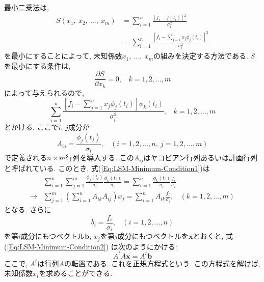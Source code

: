 最小二乗法は, 
\begin{align}
    S(x_{1},~ x_{2},~\ldots,~ x_{m})
    &=
    \sum_{i=1}^{n} \frac{[f_{i} - f(t_{i})]^{2}}{\sigma_{i}^{2}}
    \\ &=
    \sum_{i=1}^{n}
    \frac{[f_{i} - \sum_{j=1}^{n} x_{j} \phi_{j}(t_{i})]^{2}}
    {\sigma_{i}^{2}}
\end{align}
を最小にすることによって, 未知係数$x_{1},~\ldots,~x_{m}$の組みを決定する方法である. 
$S$を最小にする条件は, 
\begin{equation}
    \frac{\partial S}{\partial x_{k}} = 0,
    ~~~~
    k = 1,2,\ldots,m
\end{equation}
によって与えられるので, 
\begin{equation}
    \sum_{i=1}^{n}
    \frac{[f_{i} - \sum_{j=1}^{n} x_{j} \phi_{j}(t_{i})]\phi_{k}(t_{i})}
    {\sigma_{i}^{2}},
    ~~~~
    k = 1,2,\ldots,m
    \label{Eq:LSM-Minimum-Condition1}
\end{equation}
とかける. ここで$i$, $j$成分が
\begin{equation}
    A_{ij} = \frac{\phi_{j}(t_{j})}{\sigma_{i}},
    ~~~~
    (i = 1,2,\ldots,n,
    ~
    j = 1,2,\ldots,m)
\end{equation}
で定義される$n \times m$行列を導入する. 
この$A_{ij}$はヤコビアン行列あるいは計画行列と呼ばれている. 
このとき, 式(\ref{Eq:LSM-Minimum-Condition1})は
\begin{align}
    &
    \sum_{i=1}^{n} \sum_{j=1}^{m}
    \frac{\phi_{j}(t_{i})}{\sigma_{i}}
    \frac{\phi_{k}(t_{i})}{\sigma_{i}} =
    \sum_{i=1}^{n}
    \frac{\phi_{k}(t_{i})}{\sigma_{i}}
    \frac{f_{i}}{\sigma_{i}}
    \\
    \to &
    \sum_{j=1}^{m}
    \left(\sum_{i=1}^{n} A_{ik} A_{ij}\right) x_{j}
    =
    \sum_{i=1}^{n}
    A_{ik} \frac{f_{i}}{\sigma_{i}},
    ~~~~
    (k = 1,2,\ldots,m)
    \label{Eq:LSM-Minimum-Condition2}
\end{align}
となる. さらに
\begin{equation}
    b_{i} = \frac{f_{i}}{\sigma_{i}},
    ~~~~
    (i=1,2,\ldots,n)
\end{equation}
を第$i$成分にもつベクトル$\bm{b}$, 
$x_{j}$を第$j$成分にもつベクトルを$\bm{x}$とおくと, 式(\ref{Eq:LSM-Minimum-Condition2})
は次のようにかける:
\begin{equation}
    A^{t}A \bm{x} = A^{t} \bm{b}
\end{equation}
ここで, $A^{t}$は行列$A$の転置である. 
これを正規方程式という. 
この方程式を解けば, 未知係数$x_{i}$を求めることができる. 

